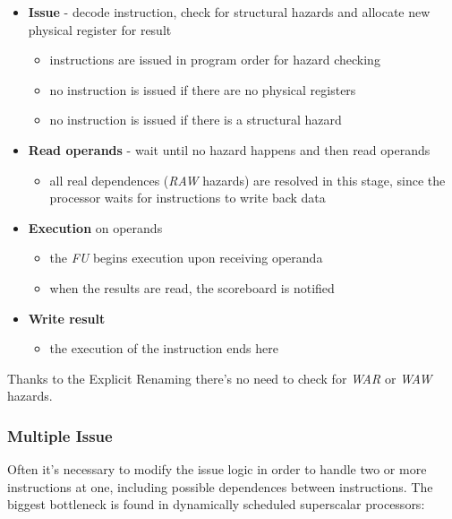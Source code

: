 \documentclass[english]{article}
\begin{document}
\begin{itemize}
  \item \textbf{Issue} - decode instruction, check for structural hazards and allocate new physical register for result
        \begin{itemize}
          \item instructions are issued in program order for hazard checking
          \item no instruction is issued if there are no physical registers
          \item no instruction is issued if there is a structural hazard
        \end{itemize}
  \item \textbf{Read operands} - wait until no hazard happens and then read operands
        \begin{itemize}
          \item all real  dependences (\textit{RAW} hazards) are resolved in this stage, since the processor waits for instructions to write back data
        \end{itemize}
  \item \textbf{Execution} on operands
        \begin{itemize}
          \item the \textit{FU} begins execution upon receiving operanda
          \item when the results are read, the scoreboard is notified
        \end{itemize}
  \item \textbf{Write result}
        \begin{itemize}
          \item the execution of the instruction ends here
        \end{itemize}
\end{itemize}

\bigskip
Thanks to the Explicit Renaming there's no need to check for \textit{WAR} or \textit{WAW} hazards.

\subsubsection{Multiple Issue}

Often it's necessary to modify the issue logic in order to handle two or more instructions at one, including possible dependences between instructions.
The biggest bottleneck is found in dynamically scheduled superscalar processors:
\end{document}
